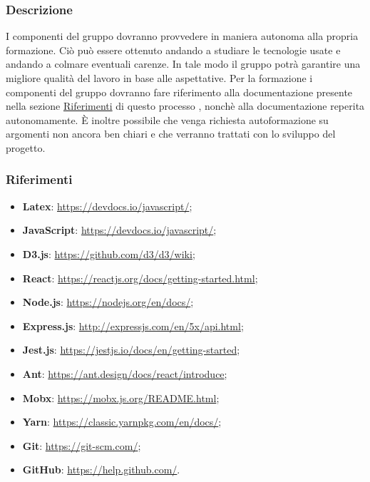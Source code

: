 			\subsubsection{Descrizione}
			I componenti del gruppo dovranno provvedere in maniera autonoma alla propria formazione. Ciò può essere ottenuto andando a studiare le tecnologie usate e andando a colmare eventuali carenze. In tale modo il gruppo potrà garantire una migliore qualità del lavoro in base alle aspettative. Per la formazione i componenti del gruppo dovranno fare riferimento alla documentazione presente nella sezione \hyperref[sec:Riferimenti]{Riferimenti} di questo processo , nonchè alla documentazione reperita autonomamente.
			È inoltre possibile che venga richiesta autoformazione su argomenti non ancora ben chiari e che verranno trattati con lo sviluppo del progetto.	
			
			\subsubsection{Riferimenti} \label{sec:Riferimenti}
				\begin{itemize}
					\item \textbf{Latex}: \url{https://devdocs.io/javascript/};
					\item \textbf{JavaScript}: \url{https://devdocs.io/javascript/};
					\item \textbf{D3.js}: \url{https://github.com/d3/d3/wiki};
					\item \textbf{React}: \url{https://reactjs.org/docs/getting-started.html};
					\item \textbf{Node.js}: \url{https://nodejs.org/en/docs/};
					\item \textbf{Express.js}: \url{http://expressjs.com/en/5x/api.html};
					\item \textbf{Jest.js}: \url{https://jestjs.io/docs/en/getting-started};
					\item \textbf{Ant}: \url{https://ant.design/docs/react/introduce};
					\item \textbf{Mobx}: \url{https://mobx.js.org/README.html};
					\item \textbf{Yarn}: \url{https://classic.yarnpkg.com/en/docs/};
					\item \textbf{Git}: \url{https://git-scm.com/};
					\item \textbf{GitHub}: \url{https://help.github.com/}.
				\end{itemize}
		
